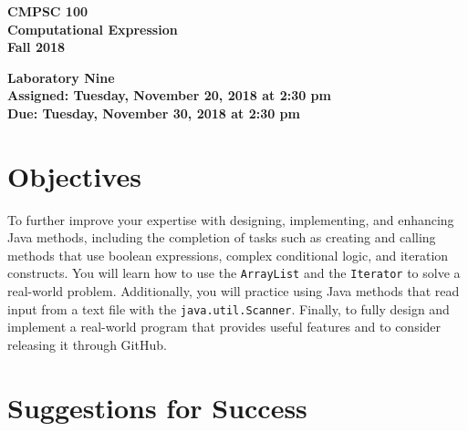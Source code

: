 \documentclass[11pt]{article}
\newcommand{\assignmentduedate}{November 30}
\newcommand{\assignmentassignedate}{November 20}
\newcommand{\assignmentnumber}{Nine}
\newcommand{\labyear}{2018}
\newcommand{\labday}{Tuesday}
\newcommand{\labtime}{2:30 pm}
\newcommand{\assigneddate}{Assigned: \labday, \assignmentassignedate, \labyear{} at \labtime{}}
\newcommand{\duedate}{Due: \labday, \assignmentduedate, \labyear{} at \labtime{}}
\newcommand{\program}[1]{\lstinline{#1}}
\newcommand{\labtitle}[1]
{
  \begin{center}
    \begin{center}
      \bf
      CMPSC 100\\Computational Expression\\
      Fall 2018\\
      \medskip
    \end{center}
    \bf
    #1
  \end{center}
}
\begin{document}
\thispagestyle{empty}

\labtitle{Laboratory \assignmentnumber{} \\ \assigneddate{} \\ \duedate{}}

\section*{Objectives}

To further improve your expertise with designing, implementing, and enhancing
Java methods, including the completion of tasks such as creating and calling
methods that use boolean expressions, complex conditional logic, and iteration
constructs. You will learn how to use the \program{ArrayList} and the
\program{Iterator} to solve a real-world problem. Additionally, you will
practice using Java methods that read input from a text file with the
\program{java.util.Scanner}. Finally, to fully design and implement a real-world
program that provides useful features and to consider releasing it through
GitHub.



\section*{Suggestions for Success}
\end{document}
